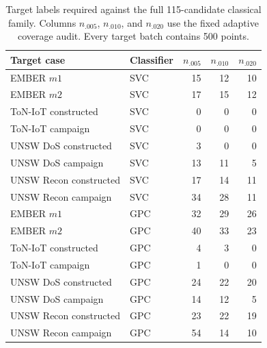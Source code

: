 \documentclass[11pt]{article}
\begin{document}
\begin{table}[H]
\centering
\caption{Target labels required against the full 115-candidate classical
family. Columns $n_{.005}$, $n_{.010}$, and $n_{.020}$ use the fixed adaptive
coverage audit. Every target batch contains 500 points.}
\label{supp:tab_v9_thresholds}
\scriptsize
\setlength{\tabcolsep}{4pt}
\begin{tabular}{llrrr}
\toprule
Target case & Classifier & $n_{.005}$ & $n_{.010}$ & $n_{.020}$\\
\midrule
EMBER $m1$ & SVC & 15 & 12 & 10\\
EMBER $m2$ & SVC & 17 & 15 & 12\\
ToN-IoT constructed & SVC & 0 & 0 & 0\\
ToN-IoT campaign & SVC & 0 & 0 & 0\\
UNSW DoS constructed & SVC & 3 & 0 & 0\\
UNSW DoS campaign & SVC & 13 & 11 & 5\\
UNSW Recon constructed & SVC & 17 & 14 & 11\\
UNSW Recon campaign & SVC & 34 & 28 & 11\\
\addlinespace
EMBER $m1$ & GPC & 32 & 29 & 26\\
EMBER $m2$ & GPC & 40 & 33 & 23\\
ToN-IoT constructed & GPC & 4 & 3 & 0\\
ToN-IoT campaign & GPC & 1 & 0 & 0\\
UNSW DoS constructed & GPC & 24 & 22 & 20\\
UNSW DoS campaign & GPC & 14 & 12 & 5\\
UNSW Recon constructed & GPC & 23 & 22 & 19\\
UNSW Recon campaign & GPC & 54 & 14 & 10\\
\bottomrule
\end{tabular}
\end{table}
\end{document}
